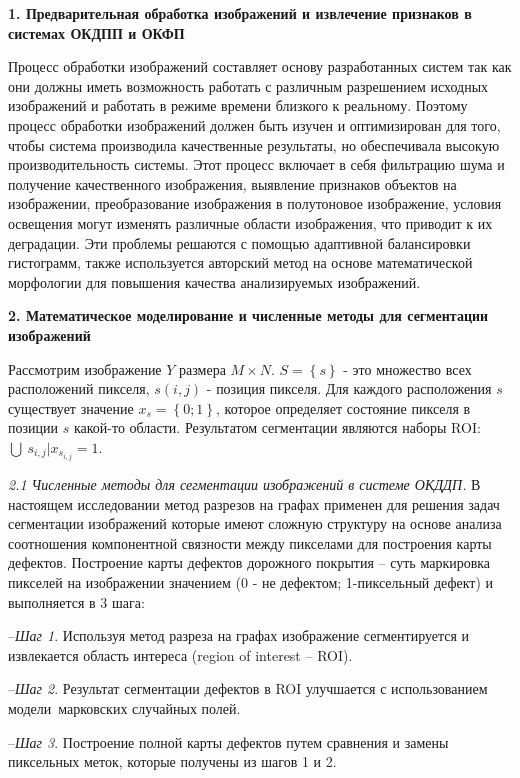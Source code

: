 \textbf{1. Предварительная обработка изображений и извлечение признаков в системах ОКДПП и ОКФП}

Процесс обработки изображений составляет основу разработанных систем так как они должны иметь возможность работать с различным разрешением исходных изображений и работать в режиме времени близкого к реальному. Поэтому процесс обработки изображений должен быть изучен и оптимизирован для того, чтобы система производила качественные результаты, но обеспечивала высокую производительность системы. Этот процесс включает в себя фильтрацию шума и получение качественного изображения, выявление признаков объектов на изображении, преобразование изображения в полутоновое изображение, условия освещения могут изменять различные области изображения, что приводит к их деградации. Эти проблемы решаются с помощью адаптивной балансировки гистограмм, также используется авторский метод на основе математической морфологии для повышения качества анализируемых изображений.

\textbf{2. Математическое моделирование и численные методы для сегментации изображений}

Рассмотрим изображение $Y$ размера $M \times N$. $S = \left\{s\right\}$ - это множество всех расположений пикселя, $s \left(i, j\right)$ - позиция пикселя. Для каждого расположения $s$ существует значение $x_s=\left\{0;1\right\}$, которое определяет состояние пикселя в позиции $s$ какой-то области. Результатом сегментации являются наборы ROI: $\bigcup\ s_{i,j} | x_{s_{i,j}}=1$.

\textit{2.1 Численные методы для сегментации изображений в системе ОКДДП.} В настоящем исследовании метод разрезов на графах применен для решения задач сегментации изображений которые имеют сложную структуру на основе анализа соотношения компонентной связности между пикселами для построения карты дефектов. Построение карты дефектов дорожного покрытия -- суть маркировка пикселей на изображении значением (0 - не дефектом; 1-пиксельный дефект) и выполняется в 3 шага:

--\textit{Шаг 1}. Используя метод разреза на графах изображение сегментируется и извлекается область интереса (region of interest -- ROI).

--\textit{Шаг 2}. Результат сегментации дефектов в ROI улучшается с использованием модели марковских случайных полей.

--\textit{Шаг 3}. Построение полной карты дефектов путем сравнения и замены пиксельных меток, которые получены из шагов 1 и 2.



